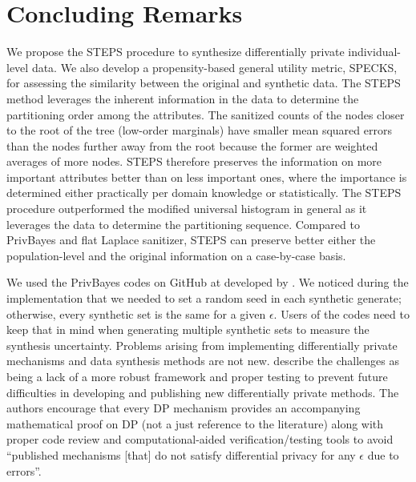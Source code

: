\documentclass[12pt, A4]{article}
\theoremstyle{plain}
\theoremstyle{exampstyle}\newtheorem{defn}{Definition}
\theoremstyle{exampstyle}\newtheorem{lem}{Lemma}
\theoremstyle{exampstyle}\newtheorem{cor}{Corollary}
\theoremstyle{exampstyle}\newtheorem{pro}{Proposition}
\theoremstyle{exampstyle}\newtheorem{cla}{Claim}
\theoremstyle{exampstyle}\newtheorem{rem}{Remark}
\begin{document}
\section{Concluding Remarks}\label{sec:disc}

We propose the STEPS procedure to synthesize differentially private individual-level data. We also develop a propensity-based general utility metric, SPECKS, for assessing the similarity between the original and synthetic data. The STEPS method leverages the inherent information in the data to determine the partitioning order among the attributes. The sanitized counts of the nodes closer to the root of the tree (low-order marginals) have smaller mean squared errors than the nodes further away from the root because the former are weighted averages of more nodes. STEPS therefore preserves the information on more important attributes better than on less important ones, where the importance is determined either practically per domain knowledge or statistically. The STEPS procedure outperformed the modified universal histogram in general as it leverages the data to determine the partitioning sequence. Compared to PrivBayes and flat Laplace sanitizer, STEPS can preserve better either the population-level and the original information on a case-by-case basis.

We used the PrivBayes codes on GitHub at \citet{DataSynthesizercodes} developed by \citet{DataSynthesizer}. We noticed during the implementation that we needed to set a random seed in each synthetic generate; otherwise, every synthetic set is the same for a given $\epsilon$. Users of the codes need to keep that in mind when generating multiple synthetic sets to measure the synthesis uncertainty. Problems arising from implementing differentially private mechanisms and data synthesis methods are not new. \citet{kifer2020guidelines} describe the challenges as being a lack of a more robust framework and proper testing to prevent future difficulties in developing and publishing new differentially private methods. The authors encourage that every DP mechanism provides an accompanying mathematical proof on DP (not a just reference to the literature) along with proper code review and computational-aided verification/testing tools to avoid ``published mechanisms [that] do not satisfy differential privacy for any $\epsilon$ due to errors''.
\end{document}
